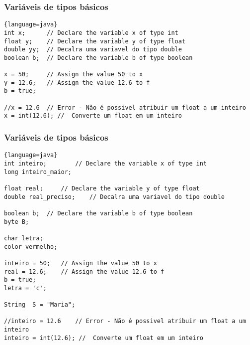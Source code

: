 \documentclass{beamer}
\begin{document}
\begin{frame}[fragile]
\frametitle{Variáveis de tipos básicos}
\begin{lstlisting}{language=java}
int x; 		// Declare the variable x of type int
float y; 	// Declare the variable y of type float
double yy; 	// Decalra uma variavel do tipo double 
boolean b; 	// Declare the variable b of type boolean

x = 50; 	// Assign the value 50 to x
y = 12.6; 	// Assign the value 12.6 to f
b = true;

//x = 12.6 	// Error - Não é possivel atribuir um float a um inteiro
x = int(12.6); //  Converte um float em um inteiro
\end{lstlisting}
\end{frame}

\begin{frame}[fragile]
\frametitle{Variáveis de tipos básicos}
\begin{lstlisting}{language=java}
int inteiro; 		// Declare the variable x of type int
long inteiro_maior; 

float real; 	// Declare the variable y of type float
double real_preciso; 	// Decalra uma variavel do tipo double 

boolean b; 	// Declare the variable b of type boolean
byte B; 

char letra; 
color vermelho; 

inteiro = 50; 	// Assign the value 50 to x
real = 12.6; 	// Assign the value 12.6 to f
b = true;
letra = 'c';

String  S = "Maria";

//inteiro = 12.6 	// Error - Não é possivel atribuir um float a um inteiro
inteiro = int(12.6); //  Converte um float em um inteiro
\end{lstlisting}
\end{frame}
\end{document}
